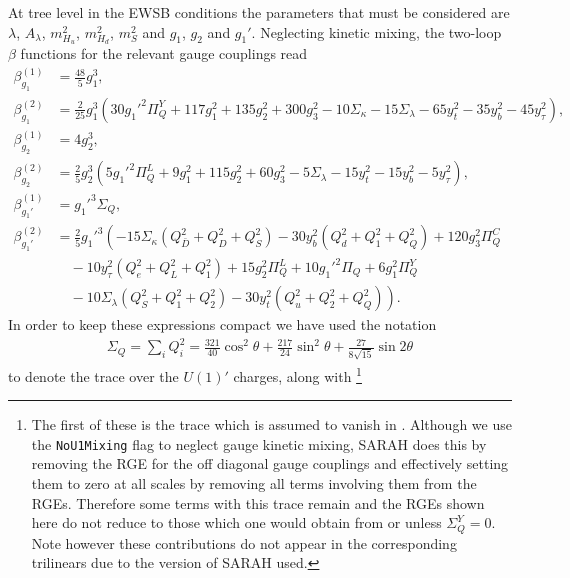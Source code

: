 \documentclass[preprint,amsmath,amssymb,aps,superscriptaddress,prd,showpacs,floatfix,nofootinbib]{revtex4-1}
\begin{document}
At tree level in the EWSB conditions the parameters that must be considered are $\lambda$,
$A_\lambda$, $m_{H_u}^2$, $m_{H_d}^2$, $m_S^2$ and $g_1$, $g_2$ and
$g_1'$. Neglecting kinetic mixing, the two-loop $\beta$ functions for
the relevant gauge couplings read
\begin{subequations}\label{eq:USSMGaugeBetas}
\begin{align}
\beta_{g_1}^{(1)}&=\frac{48}{5}g_1^3,\label{eq:USSMg1BetaOneLoop}\\
\beta_{g_1}^{(2)}&=\frac{2}{25} g_1^3 \left(30 g_1'^2 \Pi_{Q}^Y+117 g_1^2+135 g_2^2+300 g_3^2-10 \Sigma _{\kappa }-15
   \Sigma _{\lambda }-65 y_t^2-35 y_b^2-45 y_{\tau }^2\right),\label{eq:USSMg1BetaTwoLoop}\\
\beta_{g_2}^{(1)}&=4g_2^3,\label{eq:USSMg2BetaOneLoop}\\
\beta_{g_2}^{(2)}&=\frac{2}{5} g_2^3 \left(5 g_1'^2 \Pi _{Q}^L+9 g_1^2+115 g_2^2+60 g_3^2-5 \Sigma _{\lambda }-15 y_t^2-15 y_b^2-5 y_{\tau }^2\right),\label{eq:USSMg2BetaTwoLoop}\\
\beta_{g_1'}^{(1)}&=g_1'^3\Sigma_{Q},\label{eq:USSMg1pBetaOneLoop}\\
\beta_{g_1'}^{(2)}&=\frac{2}{5} g_1'^3 \left(-15 \Sigma _{\kappa } \left(Q_{\bar{D}}^2+Q_D^2+Q_S^2\right)-30
   y_b^2 \left(Q_d^2+Q_1^2+Q_Q^2\right)+120 g_3^2 \Pi _{Q}^C\right.\nonumber \\
&\quad{}-10 y_{\tau }^2
   \left(Q_e^2+Q_L^2+Q_1^2\right)+15 g_2^2 \Pi _{Q}^L+10 g_1'^2 \Pi _{Q}+6
   g_1^2 \Pi _{Q}^Y\nonumber\\
&\quad\left.{}-10 \Sigma _{\lambda } \left(Q_S^2+Q_1^2+Q_2^2\right)-30 y_t^2
   \left(Q_u^2+Q_2^2+Q_Q^2\right)\right).\label{eq:USSMg1pBetaTwoLoop}
\end{align}
\end{subequations}
In order to keep these expressions compact we have used the notation
\begin{align*}
\Sigma_{Q}=\sum_i Q_i^2=\frac{321}{40}\cos^2\theta+\frac{217}{24}\sin^2\theta+\frac{27}{8\sqrt{15}}\sin 2\theta
\end{align*}
to denote the trace over the $U(1)'$ charges, along
with \footnote{The first of these is the trace which is assumed to vanish in
  \cite{Martin:1993zk}.  Although we use the \texttt{NoU1Mixing} flag to neglect
  gauge kinetic mixing, SARAH does this by removing the RGE for
  the off diagonal gauge couplings and effectively setting them to
  zero at all scales by removing all terms involving them from the
  RGEs.  Therefore some terms with this trace remain and the RGEs shown here
  do not reduce to those which one would obtain from
  \cite{Martin:1993zk} or \cite{Athron:2009bs} unless $\Sigma_{Q}^Y =
  0$.  Note however these contributions do not appear in the
  corresponding trilinears due to the version of SARAH used. }
\end{document}
